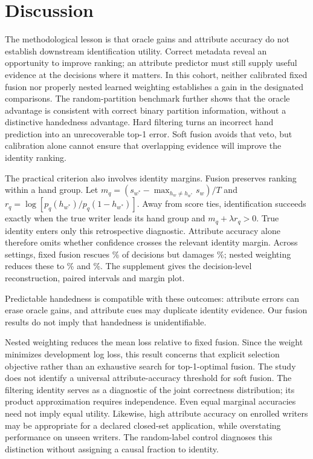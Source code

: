 \documentclass[5p,times,twocolumn,final,numbers,sort&compress]{elsarticle}
\begin{document}
\section{Discussion}
The methodological lesson is that oracle gains and attribute accuracy do not establish downstream identification utility. Correct metadata reveal an opportunity to improve ranking; an attribute predictor must still supply useful evidence at the decisions where it matters. In this cohort, neither calibrated fixed fusion nor properly nested learned weighting establishes a gain in the designated comparisons. The random-partition benchmark further shows that the oracle advantage is consistent with correct binary partition information, without a distinctive handedness advantage. Hard filtering turns an incorrect hand prediction into an unrecoverable top-1 error. Soft fusion avoids that veto, but calibration alone cannot ensure that overlapping evidence will improve the identity ranking.

The practical criterion also involves identity margins. Fusion preserves ranking within a hand group. Let $m_q=(s_{w^*}-\max_{h_w\ne h_{w^*}}s_w)/T$ and $r_q=\log[p_q(h_{w^*})/p_q(1-h_{w^*})]$. Away from score ties, identification succeeds exactly when the true writer leads its hand group and $m_q+\lambda r_q>0$. True identity enters only this retrospective diagnostic. Attribute accuracy alone therefore omits whether confidence crosses the relevant identity margin. Across settings, fixed fusion rescues \rFixedRescued\% of decisions but damages \rFixedDamaged\%; nested weighting reduces these to \rNestedRescued\% and \rNestedDamaged\%. The supplement gives the decision-level reconstruction, paired intervals and margin plot.

Predictable handedness \cite{prappo2026handedness} is compatible with these outcomes: attribute errors can erase oracle gains, and attribute cues may duplicate identity evidence. Our fusion results do not imply that handedness is unidentifiable.

Nested weighting reduces the mean loss relative to fixed fusion. Since the weight minimizes development log loss, this result concerns that explicit selection objective rather than an exhaustive search for top-1-optimal fusion. The study does not identify a universal attribute-accuracy threshold for soft fusion. The filtering identity serves as a diagnostic of the joint correctness distribution; its product approximation requires independence. Even equal marginal accuracies need not imply equal utility. Likewise, high attribute accuracy on enrolled writers may be appropriate for a declared closed-set application, while overstating performance on unseen writers. The random-label control diagnoses this distinction without assigning a causal fraction to identity.
\end{document}
